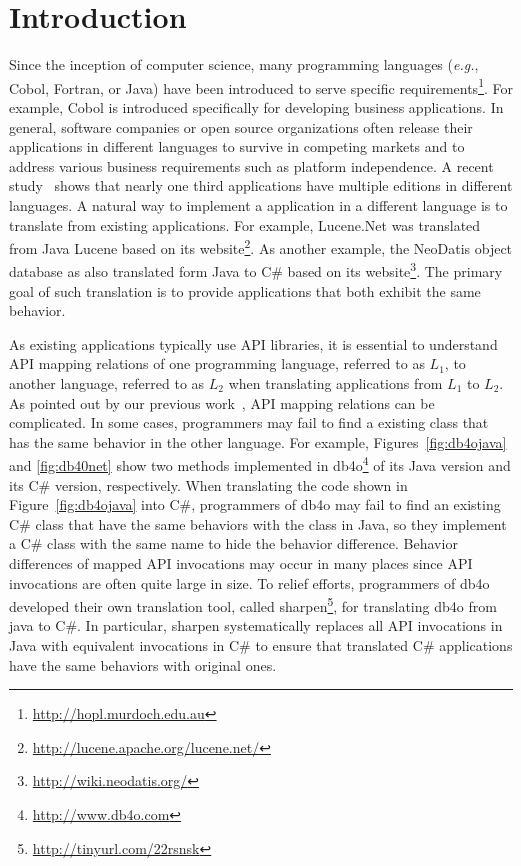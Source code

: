\section{Introduction}
\label{sec:introduction}

Since the inception of computer science, many programming languages (\emph{e.g.}, Cobol, Fortran, or Java) have been introduced to serve specific requirements\footnote{\url{http://hopl.murdoch.edu.au}}. For example, Cobol is introduced specifically for developing business applications. In general, software companies or open source organizations often release their applications in different languages to survive in competing markets and to address various business requirements such as platform independence. A recent study~\cite{jones1998estimating} shows that nearly one third applications have multiple editions in different languages. A natural way to implement a application in a different language is to translate from existing applications. For example, Lucene.Net was translated from Java Lucene based on its website\footnote{\url{http://lucene.apache.org/lucene.net/}}. As another example, the NeoDatis object database as also translated form Java to C\# based on its website\footnote{\url{http://wiki.neodatis.org/}}. The primary goal of such translation is to provide applications that both exhibit the same behavior.


As existing applications typically use API libraries, it is essential to understand API mapping relations of one programming language, referred to as $L_1$, to another language, referred to as $L_2$ when translating applications from $L_1$ to $L_2$. As pointed out by our previous work~\cite{zhong2010mining}, API mapping relations can be complicated. In some cases, programmers may fail to find a existing class that has the same behavior in the other language. For example, Figures~\ref{fig:db4ojava} and \ref{fig:db40net} show two methods implemented in db4o\footnote{\url{http://www.db4o.com}} of its Java version and its C\# version, respectively. When translating the code shown in Figure~\ref{fig:db4ojava} into C\#, programmers of db4o may fail to find an existing C\# class that have the same behaviors with the  class in Java, so they implement a C\# class with the same name to hide the behavior difference. Behavior differences of mapped API invocations may occur in many places since API invocations are often quite large in size. To relief efforts, programmers of db4o developed their own translation tool, called sharpen\footnote{\url{http://tinyurl.com/22rsnsk}}, for translating db4o from java to C\#. In particular, sharpen systematically replaces all API invocations in Java with equivalent invocations in C\# to ensure that translated C\# applications have the same behaviors with original ones.


